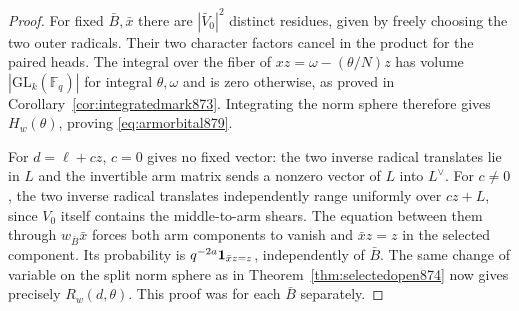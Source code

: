 \documentclass[a4paper,11pt]{article}
\theoremstyle{definition}
\theoremstyle{remark}
\numberwithin{equation}{section}
\begin{document}
\begin{proof}
For fixed \(\bar B,\bar x\) there are \(|\bar V_0|^2\) distinct
residues, given by freely choosing the two outer radicals.
Their two character factors cancel in the product for the paired
heads. The integral over the fiber of \(xz=\omega-(\theta/N)z\)
has volume \(|\mathrm{GL}_k(\mathbb F_q)|\) for integral
\(\theta,\omega\) and is zero otherwise, as proved in
Corollary~\ref{cor:integratedmark873}. Integrating the norm sphere
therefore gives \(H_w(\theta)\), proving \eqref{eq:armorbital879}.

For \(d=\ell+c z\), \(c=0\) gives no fixed vector: the two
inverse radical translates lie in \(L\) and the invertible arm
matrix sends a nonzero vector of \(L\) into \(L^\vee\). For
\(c\ne0\), the two inverse radical translates independently
range uniformly over \(cz+L\), since \(V_0\) itself contains
the middle-to-arm shears. The equation between them through
\(w_{\bar B}\bar x\) forces both arm components to vanish and
\(\bar xz=z\) in the selected component. Its probability is
\(q^{-2a}{\bf1}_{\bar xz=z}\), independently of \(\bar B\).
The same change of variable on the split norm sphere as in
Theorem~\ref{thm:selectedopen874} now gives precisely
\(R_w(d,\theta)\). This proof was for each \(\bar B\) separately.
\end{proof}
\end{document}
